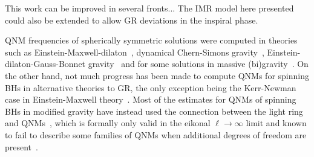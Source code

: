 This work can be improved in several fronts... The IMR model here presented could also be
extended to allow GR deviations in the inspiral phase.

QNM frequencies of spherically symmetric solutions were computed in theories such as
Einstein-Maxwell-dilaton~\cite{Ferrari:2000ep}, dynamical
Chern-Simons gravity~\cite{Molina:2010fb}, Einstein-dilaton-Gauss-Bonnet
gravity~\cite{Pani:2009wy,Blazquez-Salcedo:2016enn,Blazquez-Salcedo:2017txk}
and for some solutions in massive
(bi)gravity~\cite{Brito:2013wya,Brito:2013yxa,Babichev:2015zub}. On
the other hand, not much progress has been made to compute QNMs for
spinning BHs in alternative theories to GR, the only exception
being the Kerr-Newman case in Einstein-Maxwell
theory~\cite{Pani:2013ija,Pani:2013wsa,Mark:2014aja,Dias:2015wqa}. Most
of the estimates for QNMs of spinning BHs in modified gravity have
instead used the connection between the light ring and
QNMs~\cite{Blazquez-Salcedo:2016enn,Glampedakis:2017dvb,Jai-akson:2017ldo,Glampedakis:2017cgd},
which is formally only valid in the eikonal $\ell \to \infty$ limit
and known to fail to describe some families of QNMs when additional
degrees of freedom are present~\cite{Blazquez-Salcedo:2016enn}. 